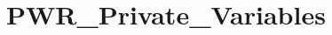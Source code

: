 \hypertarget{group___p_w_r___private___variables}{\section{P\-W\-R\-\_\-\-Private\-\_\-\-Variables}
\label{group___p_w_r___private___variables}
}
